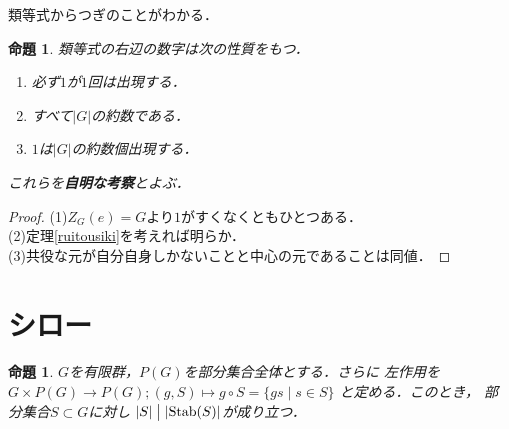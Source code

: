 \documentclass[dvipdfmx,a4paper,12pt]{jsarticle}
\newcommand{\uref}[1]{\hyperref[#1]{\textcolor{TiffanyBlue}{\underline{\ref*{#1}}}}}
\newtheorem{proposition}[theorem]{命題}
\begin{document}
類等式からつぎのことがわかる．
\begin{proposition}
    類等式の右辺の数字は次の性質をもつ．
    \begin{enumerate}
        \item 必ず$1$が$1$回は出現する．
        \item すべて$|G|$の約数である．
        \item $1$は$|G|$の約数個出現する．
    \end{enumerate}
    これらを\textbf{自明な考察}とよぶ．
\end{proposition}
\begin{proof}
    (1)$Z_G(e)=G$より$1$がすくなくともひとつある．\\
    (2)定理\uref{ruitousiki}を考えれば明らか．\\
    (3)共役な元が自分自身しかないことと中心の元であることは同値．
\end{proof}




\section{シロー}

\begin{proposition}
    $G$を有限群，$P(G)$を部分集合全体とする．さらに
    左作用を$G\times P(G)\rightarrow P(G);(g,S)\mapsto g\circ S=\{ gs\mid s\in S\}$
    と定める．このとき，
    部分集合$S\subset G$に対し
    $\lvert S\rvert \bigm| \lvert \operatorname{Stab}(S)\rvert$が成り立つ．
\end{proposition}
\end{document}
